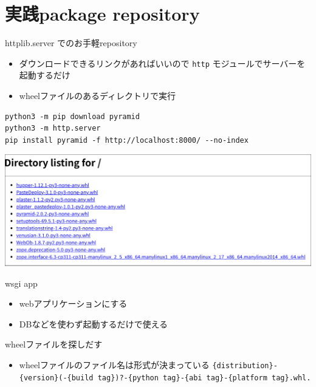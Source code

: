 \documentclass[presentation]{beamer}
\begin{document}
\section{実践package repository}
\label{sec:org4665011}
\begin{frame}[label={sec:orga2b5165},fragile]{httplib.server でのお手軽repository}
 \begin{itemize}
\item ダウンロードできるリンクがあればいいので \texttt{http} モジュールでサーバーを起動するだけ
\item wheelファイルのあるディレクトリで実行
\end{itemize}

\begin{verbatim}
python3 -m pip download pyramid
python3 -m http.server
pip install pyramid -f http://localhost:8000/ --no-index
\end{verbatim}

\begin{center}
\includegraphics[width=.9\linewidth]{./http-server-simple-repository.png}
\end{center}
\end{frame}

\begin{frame}[label={sec:org023993d}]{wsgi app}
\begin{itemize}
\item webアプリケーションにする
\item DBなどを使わず起動するだけで使える
\end{itemize}
\end{frame}

\begin{frame}[label={sec:org673c19d},fragile]{wheelファイルを探しだす}
 \begin{itemize}
\item wheelファイルのファイル名は形式が決まっている
\texttt{\{distribution\}-\{version\}(-\{build tag\})?-\{python tag\}-\{abi tag\}-\{platform tag\}.whl.}
\end{itemize}
\end{frame}
\end{document}

